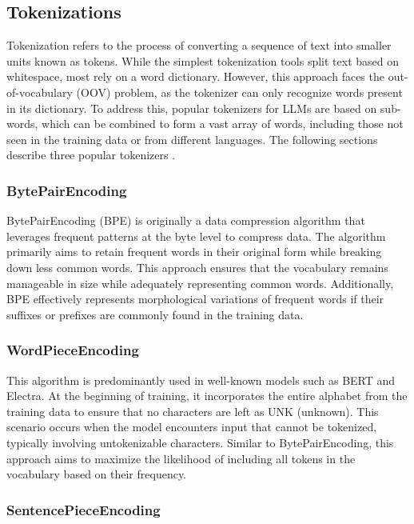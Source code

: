 \subsection{Tokenizations}

Tokenization refers to the process of converting a sequence of text into smaller units known as tokens. While the simplest tokenization tools split text based on whitespace, most rely on a word dictionary. However, this approach faces the out-of-vocabulary (OOV) problem, as the tokenizer can only recognize words present in its dictionary. To address this, popular tokenizers for LLMs are based on sub-words, which can be combined to form a vast array of words, including those not seen in the training data or from different languages. The following sections describe three popular tokenizers \cite{minaee2024large}.

\subsubsection*{BytePairEncoding}

BytePairEncoding (BPE) is originally a data compression algorithm that leverages frequent patterns at the byte level to compress data. The algorithm primarily aims to retain frequent words in their original form while breaking down less common words. This approach ensures that the vocabulary remains manageable in size while adequately representing common words. Additionally, BPE effectively represents morphological variations of frequent words if their suffixes or prefixes are commonly found in the training data.

\subsubsection*{WordPieceEncoding}

This algorithm is predominantly used in well-known models such as BERT and Electra. At the beginning of training, it incorporates the entire alphabet from the training data to ensure that no characters are left as UNK (unknown). This scenario occurs when the model encounters input that cannot be tokenized, typically involving untokenizable characters. Similar to BytePairEncoding, this approach aims to maximize the likelihood of including all tokens in the vocabulary based on their frequency.

\subsubsection*{SentencePieceEncoding}

